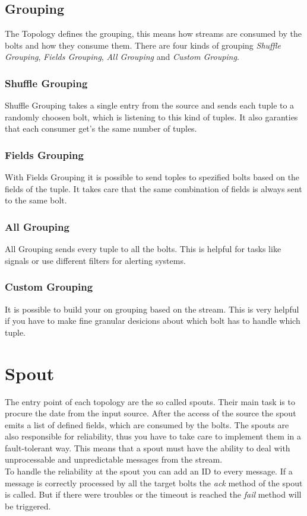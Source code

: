\subsection{Grouping}
The Topology defines the grouping, this means how streams are consumed by the bolts and how they consume them.
There are four kinds of grouping \textit{Shuffle Grouping}, \textit{Fields Grouping},
\textit{All Grouping} and \textit{Custom Grouping}.

\subsubsection{Shuffle Grouping}
Shuffle Grouping takes a single entry from the source and sends each tuple to a randomly choosen bolt,
which is listening to this kind of tuples. It also garanties that each consumer get's the same number of tuples.

\subsubsection{Fields Grouping}
With Fields Grouping it is possible to send toples to spezified bolts based on the fields of the tuple.
It takes care that the same combination of fields is always sent to the same bolt.

\subsubsection{All Grouping}
All Grouping sends every tuple to all the bolts. This is helpful for tasks like signals or
use different filters for alerting systems.

\subsubsection{Custom Grouping}
It is possible to build your on grouping based on the stream. This is very helpful if you have to make
fine granular desicions about which bolt has to handle which tuple.


\newpage

\section{Spout}
The entry point of each topology are the so called spouts. Their main task is to procure the date from the input source.
After the access of the source the spout emits a list of defined fields, which are consumed by the bolts.
The spouts are also responsible for reliability,
thus you have to take care to implement them in a fault-tolerant way. This means that a spout must have the
ability to deal with unprocessable and unpredictable messages from the stream.\\
To handle the reliability at the spout you can add an ID to every message. If a message is correctly processed  by
all the target bolts the \textit{ack} method of the spout is called. But if there were troubles or the timeout is
reached the \textit{fail} method will be triggered.


